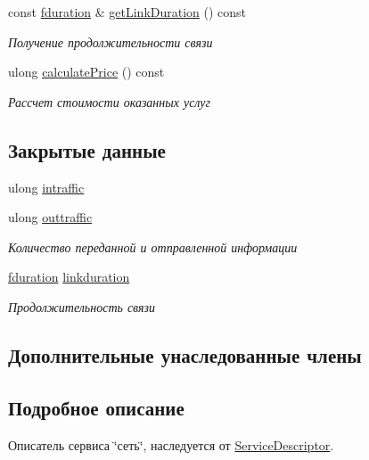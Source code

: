 \begin{DoxyCompactItemize}
const \hyperlink{networkservice_8h_a476cc728ef971cba9111c75ea41a760a}{fduration} \& \hyperlink{class_network_service_1_1_network_descriptor_a21523ecd4dfc2b54873cefd02bc1fb80}{get\+Link\+Duration} () const 
\begin{DoxyCompactList}\small\item\em Получение продолжительности связи \end{DoxyCompactList}\item 
ulong \hyperlink{class_network_service_1_1_network_descriptor_a515f9b5e56c7027101fcb000e9be96a2}{calculate\+Price} () const 
\begin{DoxyCompactList}\small\item\em Рассчет стоимости оказанных услуг \end{DoxyCompactList}\end{DoxyCompactItemize}
\subsection*{Закрытые данные}
\begin{DoxyCompactItemize}
\item 
ulong \hyperlink{class_network_service_1_1_network_descriptor_ac4fc85cab905739a9513fcfd06ca0453}{intraffic}
\item 
ulong \hyperlink{class_network_service_1_1_network_descriptor_a109969d9199b67144184e1b296406edc}{outtraffic}
\begin{DoxyCompactList}\small\item\em Количество переданной и отправленной информации \end{DoxyCompactList}\item 
\hyperlink{networkservice_8h_a476cc728ef971cba9111c75ea41a760a}{fduration} \hyperlink{class_network_service_1_1_network_descriptor_a30c7b2914f9a815341c0d11653f378db}{linkduration}
\begin{DoxyCompactList}\small\item\em Продолжительность связи \end{DoxyCompactList}\end{DoxyCompactItemize}
\subsection*{Дополнительные унаследованные члены}


\subsection{Подробное описание}
Описатель сервиса \char`\"{}сеть\char`\"{}, наследуется от \hyperlink{class_network_service_1_1_service_descriptor}{Service\+Descriptor}. 

